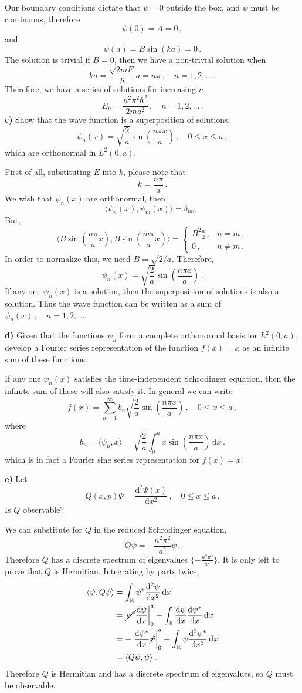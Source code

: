 \documentclass[letterpaper,10pt]{article}
\def\expect#1{\langle #1\rangle}
\def\d{\mathrm{d}}
\begin{document}
Our boundary conditions dictate that $\psi=0$ outside the box, and $\psi$ must
be continuous, therefore
\[
\psi(0)=A=0\,,
\]
and
\[
\psi(a)=B\sin(ka)=0\,.
\]
The solution is trivial if $B=0$, then we have a non-trivial solution when
\[
ka=\frac{\sqrt{2mE}}{\hbar}a=n\pi\,,\quad n=1,2,\dots\,.
\]
Therefore, we have a series of solutions for increasing $n$,
\[
E_n=\frac{n^2\pi^2\hbar^2}{2ma^2}\,,\quad n=1,2,\dots\,.
\]
\textbf{c)} Show that the wave function is a superposition of solutions,
\[
\psi_n(x)=\sqrt{\frac{2}{a}}\sin\left(\frac{n\pi x}{a}\right)\,,\quad
0\leq x\leq a\,,
\]
which are orthonormal in $L^2(0,a)$.

First of all, substituting $E$ into $k$, please note that
\[
k=\frac{n\pi}{a}\,.
\]
We wish that $\psi_n(x)$ are orthonormal, then
\[
\expect{\psi_n(x),\psi_m(x)}=\delta_{mn}\,.
\]
But,
\[
\expect{B\sin(\frac{n\pi}{a}x),B\sin(\frac{m\pi}{a}x)}=
\begin{cases}
B^2\frac{a}{2}\,,      & n=m\,,\\
0\,, & n\neq m\,.
\end{cases}
\]
In order to normalize this, we need $B=\sqrt{2/a}$.
Therefore,
\[
\psi_n(x)=\sqrt{\frac{2}{a}}\sin\left(\frac{n\pi x}{a}\right)\,.
\]
If any one $\psi_n(x)$ is a solution, then the superposition of solutions is
also a solution. Thus the wave function can be written as a sum of
$\psi_n(x)\,,\quad n=1,2,\dots$.

\textbf{d)} Given that the functions $\psi_n$ form a complete orthonormal basis
for $L^2(0,a)$, develop a Fourier series representation of the function
$f(x)=x$ as an infinite sum of these functions.

If any one $\psi_n(x)$ satisfies the time-independent Schrodinger equation, then
the infinite sum of these will also satisfy it. In general we can write
\[
f(x)=\sum_{n=1}^\infty b_n\sqrt{\frac{2}{a}}\sin\left(\frac{n\pi x}{a}\right)
\,,\quad 0\leq x\leq a\,,
\]
where
\[
b_n=\expect{\psi_n,x}=\sqrt{\frac{2}{a}}\int_0^a x\sin\left(\frac{n\pi
x}{a}\right)\,\d x\,.
\]
which is in fact a Fourier sine series representation for $f(x)=x$.

\textbf{e)} Let
\[
Q(x,p)\Psi=\frac{\d^2\Psi(x)}{\d x^2}\,,\quad 0\leq x\leq a\,.
\]
Is $Q$ observable?

We can substitute for $Q$ in the reduced Schrodinger equation,
\[
Q\psi=-\frac{n^2\pi^2}{a^2}\psi\,.
\]
Therefore $Q$ has a discrete spectrum of eigenvalues
$\{-\frac{n^2\pi^2}{a^2}\}$. It is only left to prove that $Q$ is Hermitian.
Integrating by parts twice,
\begin{align*}
\expect{\psi,Q\psi}&=\int_\mathbb{R}\psi^*\frac{\d^2\psi}{\d x^2}\,\d x\\
&=\left.\cancel{\psi^*}\frac{\d\psi}{\d x}\right|_0^a
-\int_\mathbb{R}\frac{\d\psi}{\d x}\frac{\d\psi^*}{\d x}\,\d x\\
&=-\left.\frac{\d\psi^*}{\d x}\cancel{\psi}\right|_0^a
+\int_\mathbb{R}\psi\frac{\d^2\psi^*}{\d x^2}\,\d x\\
&=\expect{Q\psi,\psi}\,.
\end{align*}
Therefore $Q$ is Hermitian and has a discrete spectrum of eigenvalues, so $Q$
must be observable.
\end{document}
